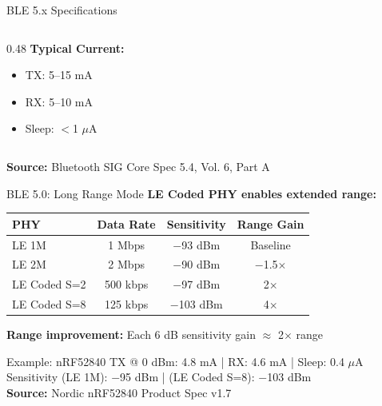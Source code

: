 \documentclass[aspectratio=169,11pt]{beamer}
\begin{document}
\begin{frame}{BLE 5.x Specifications}
\begin{columns}[T]
\begin{column}{0.48\textwidth}
            \vspace{0.2cm}
            \textbf{Typical Current:}
            \begin{itemize}
                \item TX: 5--15 mA
                \item RX: 5--10 mA
                \item Sleep: $<$1 $\mu$A
            \end{itemize}
        \end{column}
    \end{columns}
    
    \vspace{0.2cm}
    \textbf{Source:} Bluetooth SIG Core Spec 5.4, Vol. 6, Part A
\end{frame}

\begin{frame}{BLE 5.0: Long Range Mode}
    \textbf{LE Coded PHY enables extended range:}
    
    \vspace{0.3cm}
    \begin{table}
        \centering
        \begin{tabular}{@{}lccc@{}}
            \toprule
            \textbf{PHY} & \textbf{Data Rate} & \textbf{Sensitivity} & \textbf{Range Gain} \\
            \midrule
            LE 1M & 1 Mbps & $-$93 dBm & Baseline \\
            LE 2M & 2 Mbps & $-$90 dBm & $-$1.5$\times$ \\
            LE Coded S=2 & 500 kbps & $-$97 dBm & 2$\times$ \\
            LE Coded S=8 & 125 kbps & $-$103 dBm & 4$\times$ \\
            \bottomrule
        \end{tabular}
    \end{table}
    
    \vspace{0.3cm}
    \textbf{Range improvement:} Each 6 dB sensitivity gain $\approx$ 2$\times$ range
    
    \vspace{0.2cm}
    \begin{exampleblock}{Example: nRF52840}
        TX @ 0 dBm: 4.8 mA | RX: 4.6 mA | Sleep: 0.4 $\mu$A\\
        Sensitivity (LE 1M): $-$95 dBm | (LE Coded S=8): $-$103 dBm\\
        \textbf{Source:} Nordic nRF52840 Product Spec v1.7
    \end{exampleblock}
\end{frame}
\end{document}

